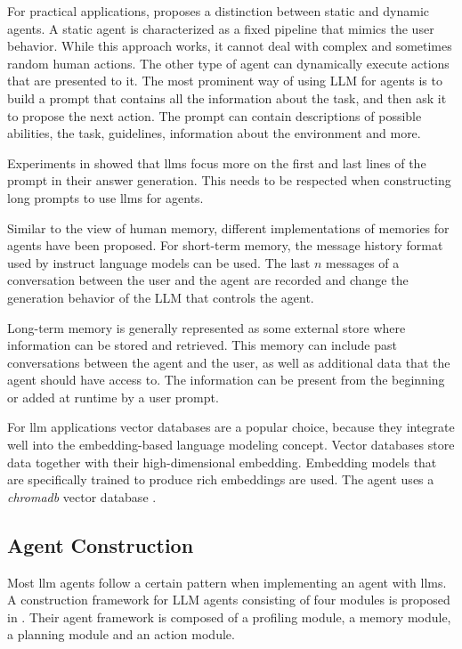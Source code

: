\documentclass[../main.tex]{subfiles}
\begin{document}
For practical applications, \autocite{Zhu2024} proposes a distinction between static and dynamic agents.
A static agent is characterized as a fixed pipeline that mimics the user behavior.
While this approach works,
it cannot deal with complex and sometimes random human actions.
The other type of agent can dynamically execute actions that are presented to it.
The most prominent way of using LLM for agents
is to build a prompt that contains all the information about the task,
and then ask it to propose the next action.
The prompt can contain descriptions of possible abilities, the task, guidelines,
information about the environment and more.

Experiments in \cite{Liu2023} showed
that \glspl{llm} focus more on the first and last lines of the prompt
in their answer generation.
This needs to be respected when constructing long prompts to use \glspl{llm} for agents.

Similar to the view of human memory,
different implementations of memories for agents have been proposed.
For short-term memory,
the message history format used by instruct language models can be used.
The last $n$ messages of a conversation between the user and the agent
are recorded and change the generation behavior of the LLM that controls the agent.

Long-term memory is generally represented as some external store
where information can be stored and retrieved.
This memory can include past conversations between the agent and the user,
as well as additional data that the agent should have access to.
The information can be present from the beginning or added at runtime by a user prompt.

For \gls{llm} applications vector databases are a popular choice,
because they integrate well into the embedding-based language modeling concept.
Vector databases store data together with their high-dimensional embedding.
Embedding models that are specifically trained to produce rich embeddings are used.
The agent uses a \emph{chromadb} vector database \autocite{zotero-176}.

\subsection{Agent Construction}

Most \gls{llm} agents follow a certain pattern
when implementing an agent with \glspl{llm}.
A construction framework for LLM agents consisting of four modules
is proposed in \cite{Wang2023}.
Their agent framework is composed of a profiling module, a memory module,
a planning module and an action module.
\end{document}
